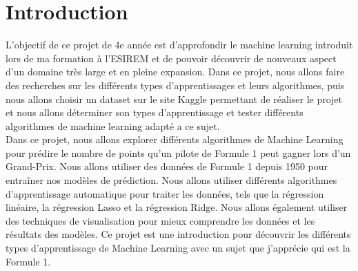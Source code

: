 \chapter{Introduction}

L'objectif de ce projet de 4e année est d'approfondir le machine learning introduit lors de ma formation à l'ESIREM et de pouvoir découvrir de nouveaux aspect d'un domaine très large et en pleine expansion. Dans ce projet, nous allons faire des recherches sur les différents types d'apprentissages et leurs algorithmes, puis nous allons choisir un dataset sur le site Kaggle permettant de réaliser le projet et nous allons déterminer son types d'apprentissage et tester différents algorithmes de machine learning adapté a ce sujet.\\

Dans ce projet, nous allons explorer différents algorithmes de Machine Learning pour prédire le nombre de points qu'un pilote de Formule 1 peut gagner lors d'un Grand-Prix. Nous allons utiliser des données de Formule 1 depuis 1950 pour entraîner nos modèles de prédiction. Nous allons utiliser différents algorithmes d'apprentissage automatique pour traiter les données, tels que la régression linéaire, la régression Lasso et la régression Ridge. Nous allons également utiliser des techniques de visualisation pour mieux comprendre les données et les résultats des modèles. Ce projet est une introduction pour découvrir les différents types d'apprentissage de Machine Learning avec un sujet que j'apprécie qui est la Formule 1.
